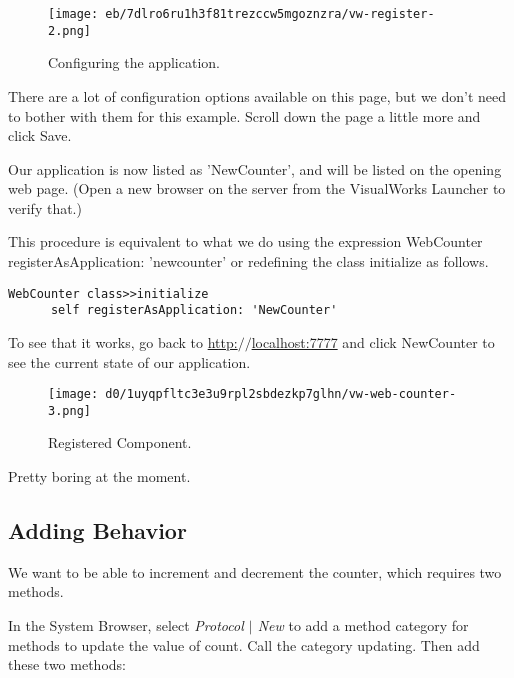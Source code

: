\documentclass[a4paper,10pt,twoside]{book}
\newcommand{\ct}[1]{{\small\ttfamily\textup{#1}}}
\begin{document}
\begin{figure}[h!tbp]
	\begin{center}
		\texttt{[image: eb/7dlro6ru1h3f81trezccw5mgoznzra/vw-register-2.png]}
		\caption{Configuring the application.\label{book:gettingstarted:cincomsmalltalk:component:registering:register2}}
	\end{center}
\end{figure}


There are a lot of configuration options available on this page, but we don't need to bother with them for this example. Scroll down the page a little more and click Save.

Our application is now listed as \ct{'NewCounter'}, and will be listed on the opening web page. (Open a new browser on the server from the VisualWorks Launcher to verify that.)

This procedure is equivalent to what we do using the expression \ct{WebCounter registerAsApplication: 'newcounter'} or redefining the class \ct{initialize} as follows.

\begin{lstlisting}
WebCounter class>>initialize
      self registerAsApplication: 'NewCounter'
\end{lstlisting}

To see that it works, go back to \href{http://localhost:7777}{http:$/$$/$localhost:7777} and click NewCounter to see the current state of our application.

\begin{figure}[h!tbp]
	\begin{center}
		\texttt{[image: d0/1uyqpfltc3e3u9rpl2sbdezkp7glhn/vw-web-counter-3.png]}
		\caption{Registered Component.\label{book:gettingstarted:cincomsmalltalk:component:registering:register3}}
	\end{center}
\end{figure}


Pretty boring at the moment. 

\subsection{Adding Behavior}
\label{book:gettingstarted:cincomsmalltalk:component:behavior}

We want to be able to increment and decrement the counter, which  requires two methods. 

In the System Browser, select \textit{Protocol $|$ New} to add a method category for methods to update the value of count. Call the category updating. Then add these two methods:
\end{document}
